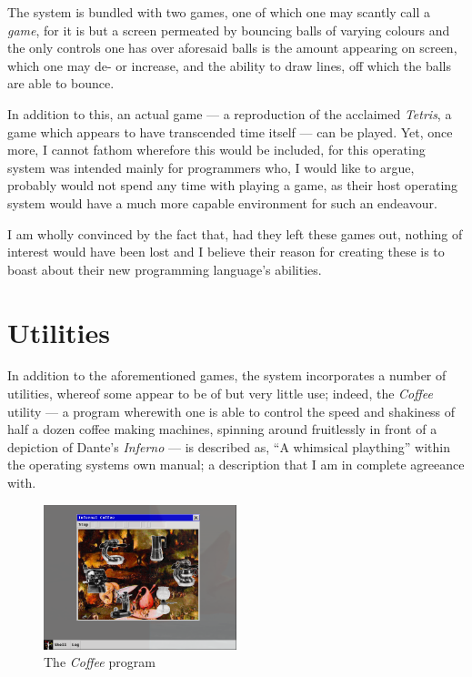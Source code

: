 \documentclass[a5paper,twoside,12pt]{report}
\begin{document}
  The system is bundled with two games, one of which one may scantly call a \textit{game}, for it is but a screen permeated by bouncing balls of varying colours and the only controls one has over aforesaid balls is the amount appearing on screen, which one may de- or increase, and the ability to draw lines, off which the balls are able to bounce.

  In addition to this, an actual game — a reproduction of the acclaimed \textit{Tetris}, a game which appears to have transcended time itself — can be played. Yet, once more, I cannot fathom wherefore this would be included, for this operating system was intended mainly for programmers who, I would like to argue, probably would not spend any time with playing a game, as their host operating system would have a much more capable environment for such an endeavour. 

  I am wholly convinced by the fact that, had they left these games out, nothing of interest would have been lost and I believe their reason for creating these is to boast about their new programming language's abilities.

  \section*{Utilities}

  In addition to the aforementioned games, the system incorporates a number of utilities, whereof some appear to be of but very little use; indeed, the \textit{Coffee} utility — a program wherewith one is able to control the speed and shakiness of half a dozen coffee making machines, spinning around fruitlessly in front of a depiction of Dante's \textit{Inferno} — is described as, ``A whimsical plaything'' within the operating systems own manual; a description that I am in complete agreeance with.

  \begin{figure}
    \centering
    \includegraphics[width=0.5\textwidth]{imgs/coffee.png}
    \caption{The \textit{Coffee} program}
  \end{figure}
\end{document}
